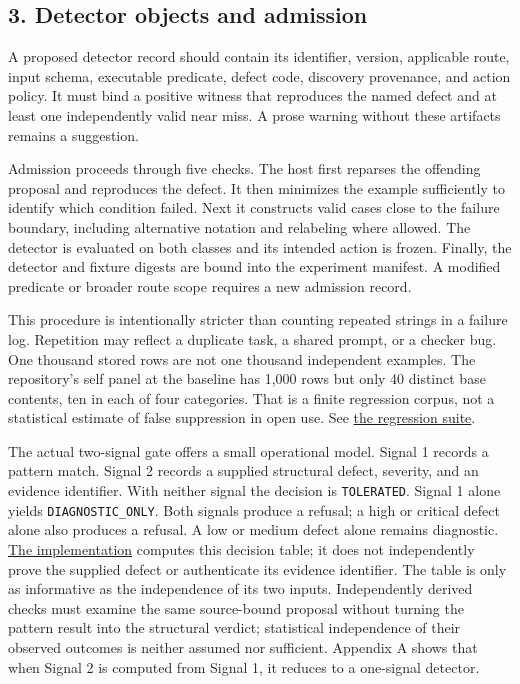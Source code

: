 \documentclass[
  11pt,
]{article}
\newcommand{\passthrough}[1]{#1}
\begin{document}
\subsection{3. Detector objects and
admission}\label{detector-objects-and-admission}

A proposed detector record should contain its identifier, version,
applicable route, input schema, executable predicate, defect code,
discovery provenance, and action policy. It must bind a positive witness
that reproduces the named defect and at least one independently valid
near miss. A prose warning without these artifacts remains a suggestion.

Admission proceeds through five checks. The host first reparses the
offending proposal and reproduces the defect. It then minimizes the
example sufficiently to identify which condition failed. Next it
constructs valid cases close to the failure boundary, including
alternative notation and relabeling where allowed. The detector is
evaluated on both classes and its intended action is frozen. Finally,
the detector and fixture digests are bound into the experiment manifest.
A modified predicate or broader route scope requires a new admission
record.

This procedure is intentionally stricter than counting repeated strings
in a failure log. Repetition may reflect a duplicate task, a shared
prompt, or a checker bug. One thousand stored rows are not one thousand
independent examples. The repository's self panel at the baseline has
1,000 rows but only 40 distinct base contents, ten in each of four
categories. That is a finite regression corpus, not a statistical
estimate of false suppression in open use. See
\href{https://github.com/dbccpage/the_symbol_game/blob/52cb5457f6c485ba548cfd292f6012a941ed22cf/pfp/tests/test_immune_defect_regressions.py}{the
regression suite}.

The actual two-signal gate offers a small operational model. Signal 1
records a pattern match. Signal 2 records a supplied structural defect,
severity, and an evidence identifier. With neither signal the decision
is \passthrough{\lstinline!TOLERATED!}. Signal 1 alone yields
\nolinkurl{DIAGNOSTIC_ONLY}. Both signals produce a refusal; a high or
critical defect alone also produces a refusal. A low or medium defect
alone remains diagnostic.
\href{https://github.com/dbccpage/the_symbol_game/blob/52cb5457f6c485ba548cfd292f6012a941ed22cf/pfp/domain/immune/danger_gate.py}{The
implementation} computes this decision table; it does not independently
prove the supplied defect or authenticate its evidence identifier. The
table is only as informative as the independence of its two inputs.
Independently derived checks must examine the same source-bound proposal
without turning the pattern result into the structural verdict;
statistical independence of their observed outcomes is neither assumed
nor sufficient. Appendix A shows that when Signal 2 is computed from
Signal 1, it reduces to a one-signal detector.
\end{document}
